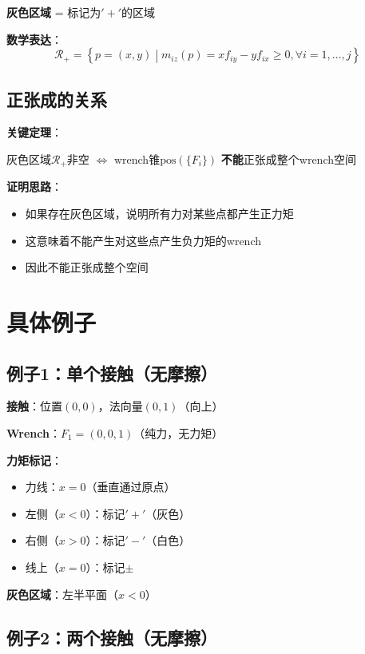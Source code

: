 \documentclass[12pt,a4paper]{article}
\begin{document}
\textbf{灰色区域} = 标记为$'+'$的区域

\textbf{数学表达}：
\begin{equation}
\mathcal{R}_+ = \left\{p = (x, y) \middle| m_{iz}(p) = x f_{iy} - y f_{ix} \geq 0, \forall i = 1, \ldots, j \right\}
\label{eq:positive_region}
\end{equation}

\subsection{正张成的关系}

\textbf{关键定理}：

灰色区域$\mathcal{R}_+$非空 $\Leftrightarrow$ wrench锥$\text{pos}(\{F_i\})$ \textbf{不能}正张成整个wrench空间

\textbf{证明思路}：
\begin{itemize}
\item 如果存在灰色区域，说明所有力对某些点都产生正力矩
\item 这意味着不能产生对这些点产生负力矩的wrench
\item 因此不能正张成整个空间
\end{itemize}

\section{具体例子}

\subsection{例子1：单个接触（无摩擦）}

\textbf{接触}：位置$(0, 0)$，法向量$(0, 1)$（向上）

\textbf{Wrench}：$F_1 = (0, 0, 1)$（纯力，无力矩）

\textbf{力矩标记}：
\begin{itemize}
\item 力线：$x = 0$（垂直通过原点）
\item 左侧（$x < 0$）：标记$'+'$（灰色）
\item 右侧（$x > 0$）：标记$'-'$（白色）
\item 线上（$x = 0$）：标记$\pm$
\end{itemize}

\textbf{灰色区域}：左半平面（$x < 0$）

\subsection{例子2：两个接触（无摩擦）}
\end{document}
